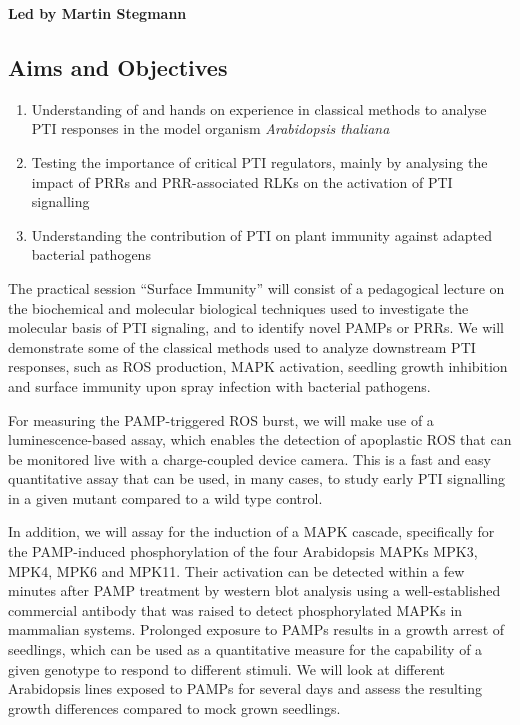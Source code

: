\documentclass[12pt,]{book}
\providecommand{\tightlist}{%
  \setlength{\itemsep}{0pt}\setlength{\parskip}{0pt}}
\theoremstyle{definition}
\theoremstyle{definition}
\theoremstyle{remark}
\begin{document}
\textbf{Led by Martin Stegmann}

\subsection*{Aims and Objectives}\label{aims-and-objectives-3}

\begin{enumerate}
\def\labelenumi{\arabic{enumi}.}
\tightlist
\item
  Understanding of and hands on experience in classical methods to
  analyse PTI responses in the model organism \emph{Arabidopsis
  thaliana}
\item
  Testing the importance of critical PTI regulators, mainly by analysing
  the impact of PRRs and PRR-associated RLKs on the activation of PTI
  signalling
\item
  Understanding the contribution of PTI on plant immunity against
  adapted bacterial pathogens
\end{enumerate}

The practical session ``Surface Immunity'' will consist of a pedagogical
lecture on the biochemical and molecular biological techniques used to
investigate the molecular basis of PTI signaling, and to identify novel
PAMPs or PRRs. We will demonstrate some of the classical methods used to
analyze downstream PTI responses, such as ROS production, MAPK
activation, seedling growth inhibition and surface immunity upon spray
infection with bacterial pathogens.

For measuring the PAMP-triggered ROS burst, we will make use of a
luminescence-based assay, which enables the detection of apoplastic ROS
that can be monitored live with a charge-coupled device camera. This is
a fast and easy quantitative assay that can be used, in many cases, to
study early PTI signalling in a given mutant compared to a wild type
control.

In addition, we will assay for the induction of a MAPK cascade,
specifically for the PAMP-induced phosphorylation of the four
Arabidopsis MAPKs MPK3, MPK4, MPK6 and MPK11. Their activation can be
detected within a few minutes after PAMP treatment by western blot
analysis using a well-established commercial antibody that was raised to
detect phosphorylated MAPKs in mammalian systems. Prolonged exposure to
PAMPs results in a growth arrest of seedlings, which can be used as a
quantitative measure for the capability of a given genotype to respond
to different stimuli. We will look at different Arabidopsis lines
exposed to PAMPs for several days and assess the resulting growth
differences compared to mock grown seedlings.
\end{document}
